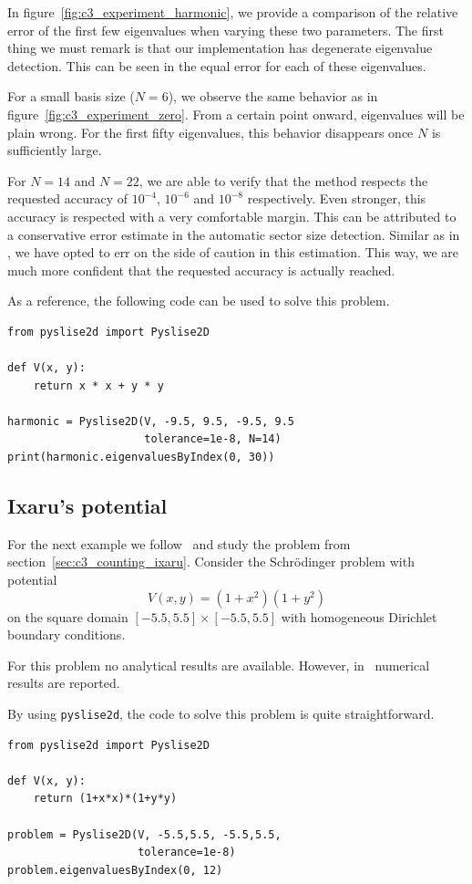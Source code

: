 In figure~\ref{fig:c3_experiment_harmonic}, we provide a comparison of the relative error of the first few eigenvalues when varying these two parameters. The first thing we must remark is that our implementation has degenerate eigenvalue detection. This can be seen in the equal error for each of these eigenvalues.

For a small basis size ($N = 6$), we observe the same behavior as in figure~\ref{fig:c3_experiment_zero}. From a certain point onward, eigenvalues will be plain wrong. For the first fifty eigenvalues, this behavior disappears once $N$ is sufficiently large.

For $N = 14$ and $N = 22$, we are able to verify that the method respects the requested accuracy of $10^{-4}$, $10^{-6}$ and $10^{-8}$ respectively. Even stronger, this accuracy is respected with a very comfortable margin. This can be attributed to a conservative error estimate in the automatic sector size detection. Similar as in , we have opted to err on the side of caution in this estimation. This way, we are much more confident that the requested accuracy is actually reached.

As a reference, the following code can be used to solve this problem.
\begin{verbatim}
from pyslise2d import Pyslise2D

def V(x, y):
    return x * x + y * y

harmonic = Pyslise2D(V, -9.5, 9.5, -9.5, 9.5
                     tolerance=1e-8, N=14)
print(harmonic.eigenvaluesByIndex(0, 30))
\end{verbatim}


\subsection{Ixaru's potential}\label{sec:c3_experiment_ixaru}

For the next example we follow~\cite{ixaru_new_2010} and study the problem from section~\ref{sec:c3_counting_ixaru}. Consider the Schrödinger problem with potential
$$
  V(x, y) = (1+x^2)(1+y^2)
$$
on the square domain $[-5.5, 5.5] \times [-5.5, 5.5]$ with homogeneous Dirichlet boundary conditions.

For this problem no analytical results are available. However, in~\cite{ixaru_new_2010} numerical results are reported.

By using \texttt{pyslise2d}, the code to solve this problem is quite straightforward.
\begin{verbatim}
from pyslise2d import Pyslise2D

def V(x, y):
    return (1+x*x)*(1+y*y)

problem = Pyslise2D(V, -5.5,5.5, -5.5,5.5,
                    tolerance=1e-8)
problem.eigenvaluesByIndex(0, 12)
\end{verbatim}

